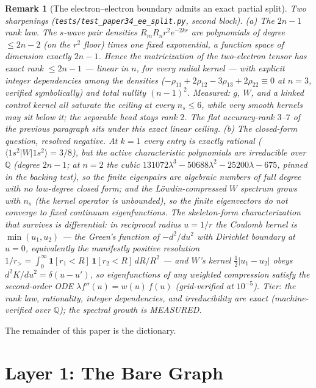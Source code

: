 \documentclass[11pt]{article}
\newtheorem{remark}{Remark}
\begin{document}
\begin{remark}[The electron--electron boundary admits an exact partial
split]
Two sharpenings
(\texttt{tests/test\_paper34\_ee\_split.py}, second block).
\emph{(a) The $2n{-}1$ rank law.}  The $s$-wave pair densities
$R_m R_n r^2 e^{-2kr}$ are polynomials of degree $\le 2n{-}2$ (on the
$r^2$ floor) times one fixed exponential, a function space of
dimension exactly $2n{-}1$.  Hence the matricization of the
two-electron tensor has exact rank $\le 2n{-}1$ --- \emph{linear} in
$n$, for \emph{every} radial kernel --- with explicit integer
dependencies among the densities
($-\rho_{11} + 2\rho_{12} - 3\rho_{13} + 2\rho_{22} \equiv 0$ at
$n=3$, verified symbolically) and total nullity $(n{-}1)^2$.
Measured: $g$, $W$, and a kinked control kernel all saturate the
ceiling at every $n_s \le 6$, while very smooth kernels may sit below
it; the separable head stays rank $2$.  The flat accuracy-rank
$3$--$7$ of the previous paragraph sits under this exact linear
ceiling.
\emph{(b) The closed-form question, resolved negative.}  At $k=1$
every entry is exactly rational
($\langle 1s^2|W|1s^2\rangle = 3/8$), but the active characteristic
polynomials are \emph{irreducible} over $\mathbb{Q}$ (degree $2n{-}1$;
at $n=2$ the cubic $131072\lambda^3 - 50688\lambda^2 - 25200\lambda -
675$, pinned in the backing test), so the finite eigenpairs are
algebraic numbers of full degree with no low-degree closed form; and
the L\"owdin-compressed $W$ spectrum \emph{grows} with $n_s$ (the
kernel operator is unbounded), so the finite eigenvectors do not
converge to fixed continuum eigenfunctions.  The skeleton-form
characterization that survives is differential: in reciprocal radius
$u = 1/r$ the Coulomb kernel is $\min(u_1, u_2)$ --- the Green's
function of $-d^2/du^2$ with Dirichlet boundary at $u=0$, equivalently
the manifestly positive resolution
$1/r_> = \int_0^\infty \mathbf{1}[r_1{<}R]\,\mathbf{1}[r_2{<}R]\,
dR/R^2$ --- and $W$'s kernel $\tfrac12|u_1 - u_2|$ obeys
$d^2 K/du^2 = \delta(u - u')$, so eigenfunctions of any weighted
compression satisfy the second-order ODE
$\lambda f''(u) = w(u)\, f(u)$ (grid-verified at $10^{-5}$).
\emph{Tier:} the rank law, rationality, integer dependencies, and
irreducibility are exact (machine-verified over $\mathbb{Q}$); the
spectral growth is MEASURED.
\end{remark}

The remainder of this paper is the dictionary.

\section{Layer 1: The Bare Graph}
\label{sec:layer1}
\end{document}
